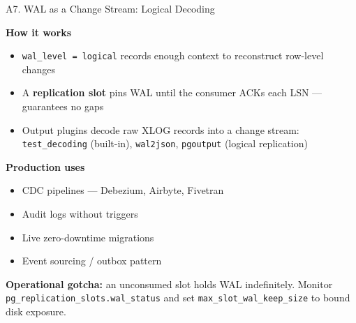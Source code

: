\documentclass[aspectratio=169,10pt]{beamer}
\begin{document}
\begin{frame}{A7. WAL as a Change Stream: Logical Decoding}

  \textbf{How it works}
  \begin{itemize}
    \item \texttt{wal\_level = logical} records enough context to reconstruct row-level changes
    \item A \textbf{replication slot} pins WAL until the consumer ACKs each LSN — guarantees no gaps
    \item Output plugins decode raw XLOG records into a change stream:\\
          \texttt{test\_decoding} (built-in), \texttt{wal2json}, \texttt{pgoutput} (logical replication)
  \end{itemize}

  \vspace{0.8em}
  \textbf{Production uses}
  \begin{itemize}
    \item CDC pipelines — Debezium, Airbyte, Fivetran
    \item Audit logs without triggers
    \item Live zero-downtime migrations
    \item Event sourcing / outbox pattern
  \end{itemize}

  \vspace{0.8em}
  {\small \textbf{Operational gotcha:} an unconsumed slot holds WAL indefinitely.
  Monitor \texttt{pg\_replication\_slots.wal\_status} and set
  \texttt{max\_slot\_wal\_keep\_size} to bound disk exposure.}

\end{frame}
\end{document}
